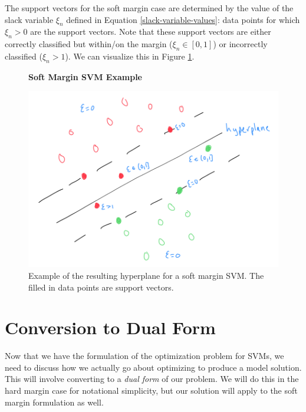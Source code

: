 The support vectors for the soft margin case are determined by the value of the slack variable $\xi_{n}$ defined in Equation \ref{slack-variable-values}: data points for which $\xi_{n} > 0$ are the support vectors. Note that these support vectors are either correctly classified but within/on the margin ($\xi_{n} \in [0,1]$) or incorrectly classified ($\xi_{n} > 1$). We can visualize this in Figure \ref{fig:soft-margin-svm}.


\begin{figure}
    \centering
    \textbf{Soft Margin SVM Example}\par\medskip
    \includegraphics[width=0.5\paperwidth]{../SupportVectorMachines/fig/soft-margin-svm.png}
    \caption{Example of the resulting hyperplane for a soft margin SVM. The filled in data points are support vectors.}
    \label{fig:soft-margin-svm}
\end{figure}

\section{Conversion to Dual Form}
Now that we have the formulation of the optimization problem for SVMs, we need to discuss how we actually go about optimizing to produce a model solution. This will involve converting to a \textit{dual form} of our problem. We will do this in the hard margin case for notational simplicity, but our solution will apply to the soft margin formulation as well.


